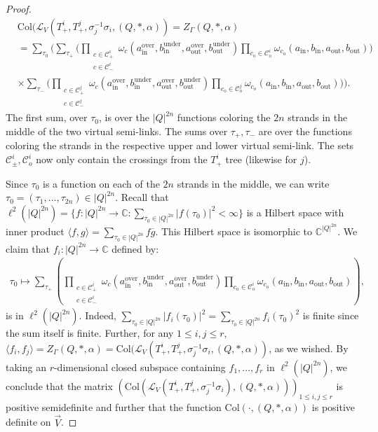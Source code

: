 \documentclass[11pt, twoside]{amsart}
\numberwithin{equation}{section}
\theoremstyle{definition}
\numberwithin{equation}{section}
\begin{document}
\begin{proof}
    \begin{align*}
        &\text{Col}(\mathscr{L}_{V}(T_+^i,T_+^j, \sigma_j^{-1}\sigma_i, (Q,*,\alpha))=Z_\Gamma(Q,*,\alpha)\\
        &= \sum_{\tau_0} \Biggl(\sum_{\tau_+}\Biggl(\prod_{\substack{c \in \mathcal{C}_+^i\\ c\in \mathcal{C}_-^i} }\omega_{c} (a_{\text{in}}^\text{over}, b_{\text{in}}^\text{under}, a_{\text{out}}^\text{over},b_{\text{out}}^\text{under})\prod_{c_\text{o}\in \mathcal{C}_\text{o}^i}\omega_{c_\text{o}}(a_\text{in}, b_\text{in}, a_\text{out}, b_\text{out})\Biggr)\\
        &\times \sum_{\tau_-}\Biggl(\prod_{\substack{c \in \mathcal{C}_+^j\\ c\in \mathcal{C}_-^j} }\omega_{c} (a_{\text{in}}^\text{over}, b_{\text{in}}^\text{under}, a_{\text{out}}^\text{over},b_{\text{out}}^\text{under})\prod_{c_\text{o}\in \mathcal{C}_\text{o}^j}\omega_{c_\text{o}}(a_\text{in}, b_\text{in}, a_\text{out}, b_\text{out})\Biggr)\Biggr).
    \end{align*}
    The first sum, over $\tau_0$, is over the $|Q|^{2n}$ functions coloring the $2n$ strands in the middle of the two virtual semi-links. The sums over $\tau_+, \tau_-$ are over the functions coloring the strands in the respective upper and lower virtual semi-link. The sets $\mathcal{C}_\pm^i, \mathcal{C}_o^i$ now only contain the crossings from the $T_+^i$ tree (likewise for $j$). 

    Since $\tau_0$ is a function on each of the $2n$ strands in the middle, we can write $\tau_0=(\tau_1,...,\tau_{2n})\in |Q|^{2n}$. Recall that $\ell^2(|Q|^{2n})=\{f:|Q|^{2n} \to \mathbb{C}:\sum_{\tau_0\in |Q|^{2n}} |f(\tau_0)|^2<\infty\}$ is a Hilbert space with inner product $\langle f, g\rangle =\sum_{\tau_0 \in |Q|^{2n}} f \overline{g}$. This Hilbert space is isomorphic to $\mathbb{C}^{|Q|^{2n}}$. We claim that $f_i:|Q|^{2n}\to \mathbb{C}$ defined by:
    \begin{align*}
        \tau_0 \mapsto \sum_{\tau_+}\left(\prod_{\substack{c \in \mathcal{C}_+^i\\ c\in \mathcal{C}_-^i} }\omega_{c} (a_{\text{in}}^\text{over}, b_{\text{in}}^\text{under}, a_{\text{out}}^\text{over},b_{\text{out}}^\text{under})\prod_{c_\text{o}\in \mathcal{C}_\text{o}^i}\omega_{c_\text{o}}(a_\text{in}, b_\text{in}, a_\text{out}, b_\text{out})\right),
    \end{align*}
    is in $\ell^2(|Q|^{2n})$. Indeed, $\sum_{\tau_0\in |Q|^{2n}}|f_i(\tau_0)|^2=\sum_{\tau_0\in |Q|^{2n}}f_i(\tau_0)^2$ is finite since the sum itself is finite. Further, for any $1\leq i,j \leq r$, $\langle f_i, f_j\rangle=Z_\Gamma(Q,*,\alpha)=\text{Col}(\mathscr{L}_{V}(T_+^i,T_+^j, \sigma_j^{-1}\sigma_i, (Q,*,\alpha))$, as we wished. By taking an $r$-dimensional closed subspace containing $f_1,...,f_r$ in $\ell^2(|Q|^{2n})$, we conclude that the matrix $\left(\text{Col}(\mathscr{L}_{V}(T_+^i, T_+^j, \sigma_j^{-1}\sigma_i), (Q,*,\alpha))\right)_{1\leq i,j \leq r}$ is positive semidefinite and further that the function $\text{Col}(\cdot,(Q,*,
\alpha))$ is positive definite on $\vec{V}$.
\end{proof}
\end{document}
